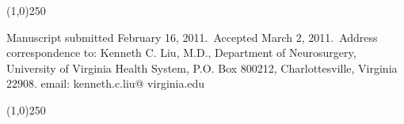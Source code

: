 \documentclass{article}
\begin{document}
\begin{center}
\line(1,0){250}
\end{center}

\begin{center}
Manuscript submitted February 16, 2011.\
Accepted March 2, 2011.\
Address correspondence to: Kenneth C. Liu, M.D., Department
of Neurosurgery, University of Virginia Health System, P.O. Box
800212, Charlottesville, Virginia 22908. email: kenneth.c.liu@
virginia.edu
\end{center}

\begin{center}
\line(1,0){250}
\end{center}
\end{document}
